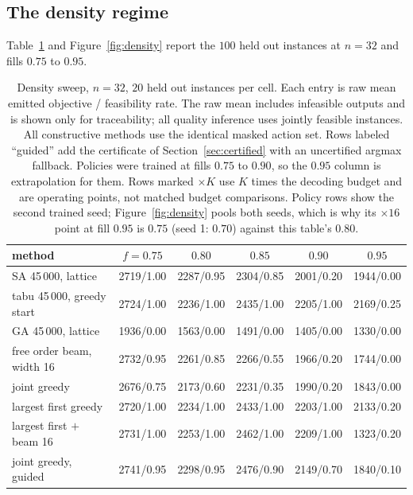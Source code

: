 \documentclass[preprint,12pt,authoryear]{elsarticle}
\newif\iflegacydetails
\begin{document}
\iflegacydetails
\subsection{The density regime}
\label{sec:results_density}
Table~\ref{tab:density} and Figure~\ref{fig:density} report the $100$ held out
instances at $n=32$ and fills $0.75$ to $0.95$.

\begin{table}[t]
\centering
\caption{Density sweep, $n=32$, $20$ held out instances per cell. Each entry is
raw mean emitted objective / feasibility rate. The raw mean includes infeasible
outputs and is shown only for traceability; all quality inference uses jointly
feasible instances. All constructive methods use the identical
masked action set. Rows labeled ``guided'' add the certificate of
Section~\ref{sec:certified} with an uncertified argmax fallback. Policies were
trained at fills $0.75$ to $0.90$, so the
$0.95$ column is extrapolation for them. Rows marked $\times K$ use $K$ times
the decoding budget and are operating points, not matched budget comparisons.
Policy rows show the second trained seed; Figure~\ref{fig:density} pools both
seeds, which is why its $\times16$ point at fill $0.95$ is $0.75$ (seed 1:
$0.70$) against this table's $0.80$.}
\label{tab:density}
\footnotesize
\setlength{\tabcolsep}{1.5pt}
\begin{tabular}{@{}lccccc@{}}
\toprule
method & $f{=}0.75$ & $0.80$ & $0.85$ & $0.90$ & $0.95$ \\
\midrule
SA 45\,000, lattice              & 2719/1.00 & 2287/0.95 & 2304/0.85 & 2001/0.20 & 1944/0.00 \\
tabu 45\,000, greedy start       & 2724/1.00 & 2236/1.00 & 2435/1.00 & 2205/1.00 & 2169/0.25 \\
GA 45\,000, lattice              & 1936/0.00 & 1563/0.00 & 1491/0.00 & 1405/0.00 & 1330/0.00 \\
free order beam, width 16        & 2732/0.95 & 2261/0.85 & 2266/0.55 & 1966/0.20 & 1744/0.00 \\
joint greedy                     & 2676/0.75 & 2173/0.60 & 2231/0.35 & 1990/0.20 & 1843/0.00 \\
largest first greedy             & 2720/1.00 & 2234/1.00 & 2433/1.00 & 2203/1.00 & 2133/0.20 \\
largest first $+$ beam 16        & 2731/1.00 & 2253/1.00 & 2462/1.00 & 2209/1.00 & 1323/0.20 \\
\midrule
joint greedy, guided             & 2741/0.95 & 2298/0.95 & 2476/0.90 & 2149/0.70 & 1840/0.10 \\

\end{tabular}
\end{table}
\end{document}
